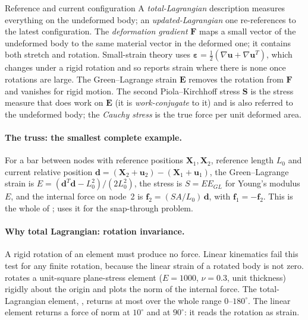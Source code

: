 \begin{sidenote}{Reference and current configuration}
A \emph{total-Lagrangian} description measures everything on the undeformed body; an \emph{updated-Lagrangian} one re-references to the latest configuration. The \emph{deformation gradient} $\bm F$ maps a small vector of the undeformed body to the same material vector in the deformed one; it contains both stretch and rotation. Small-strain theory uses $\bm\varepsilon=\tfrac12(\nabla\bm u+\nabla\bm u^T)$, which changes under a rigid rotation and so reports strain where there is none once rotations are large. The Green--Lagrange strain $\bm E$ removes the rotation from $\bm F$ and vanishes for rigid motion. The second Piola--Kirchhoff stress $\bm S$ is the stress measure that does work on $\bm E$ (it is \emph{work-conjugate} to it) and is also referred to the undeformed body; the \emph{Cauchy stress} is the true force per unit deformed area.
\end{sidenote}

\paragraph{The truss: the smallest complete example.}
For a bar between nodes with reference positions $\bm X_1,\bm X_2$, reference length $L_0$ and current relative position $\bm d=(\bm X_2+\bm u_2)-(\bm X_1+\bm u_1)$, the Green--Lagrange strain is $E=(\bm d^T\bm d-L_0^2)/(2L_0^2)$, the stress is $S=EE_{GL}$ for Young's modulus $E$, and the internal force on node~2 is $\bm f_2=(SA/L_0)\,\bm d$, with $\bm f_1=-\bm f_2$. This is the whole of ;  uses it for the snap-through problem.

\paragraph{Why total Lagrangian: rotation invariance.}
A rigid rotation of an element must produce no force. Linear kinematics fail this test for any finite rotation, because the linear strain of a rotated body is not zero.  rotates a unit-square plane-stress element ($E=1000$, $\nu=0.3$, unit thickness) rigidly about the origin and plots the norm of the internal force. The total-Lagrangian element, , returns at most \cnlObjTLMax over the whole range $0$--$180^\circ$. The linear element returns a force of norm \cnlObjLinTen at $10^\circ$ and \cnlObjLinNinety at $90^\circ$: it reads the rotation as strain.

